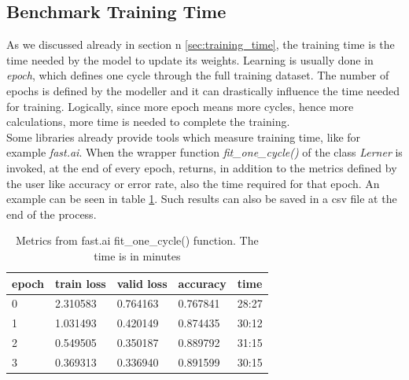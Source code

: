 \subsection{Benchmark Training Time}\label{b_trainig_time}
As we discussed already in section n \ref{sec:training_time}, the training time is the time needed by the model to update its weights. Learning is usually done in \textit{epoch}, which defines one cycle through the full training dataset. \cite{Afaq2020SignificanceOE} The number of epochs is defined by the modeller and it can drastically influence the time needed for training. Logically, since more epoch means more cycles, hence more calculations, more time is needed to complete the training.\\
Some libraries already provide tools which measure training time, like for example \textit{fast.ai}. When the wrapper function \textit{fit\_one\_cycle()} of the class \textit{Lerner} is invoked, at the end of every epoch, returns, in addition to the metrics defined by the user like accuracy or error rate, also the time required for that epoch. An example can be seen in table \ref{tab:m_fast}. Such results can also be saved in a csv file at the end of the process. \\
\begin{table}[h]
\centering
\begin{tabular}{ p{1cm} p{2cm} p{2cm} p{2cm} p{2cm}   }
 epoch&train loss &valid loss & accuracy &time\\
 \hline
0	&2.310583	&0.764163	&0.767841	&28:27\\
1	&1.031493	&0.420149	&0.874435	&30:12\\
2	&0.549505	&0.350187	&0.889792	&31:15\\
3	&0.369313	&0.336940	&0.891599	&30:15\\

 \hline
\end{tabular}
\caption[Metrics from fast.ai fit\_one\_cycle() function]{Metrics from fast.ai fit\_one\_cycle() function. The time is in minutes}
\label{tab:m_fast}
\end{table}


